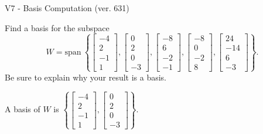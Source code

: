 \begin{exercise}
  \begin{exerciseTitle}V7 - Basis Computation (ver. 631)\end{exerciseTitle}
  \begin{exerciseStatement}
    Find a basis for the subspace 
\[W=\mathrm{span}\ \left\{\left[\begin{array}{r}
-4 \\
2 \\
-1 \\
1
\end{array}\right] , \left[\begin{array}{r}
0 \\
2 \\
0 \\
-3
\end{array}\right] , \left[\begin{array}{r}
-8 \\
6 \\
-2 \\
-1
\end{array}\right] , \left[\begin{array}{r}
-8 \\
0 \\
-2 \\
8
\end{array}\right] , \left[\begin{array}{r}
24 \\
-14 \\
6 \\
-3
\end{array}\right]\right\}.\]
 Be sure to explain why your result is a basis.


  \end{exerciseStatement}
  \begin{exerciseAnswer}
   A basis of \(W\) is  \(\left\{\left[\begin{array}{r}
-4 \\
2 \\
-1 \\
1
\end{array}\right] , \left[\begin{array}{r}
0 \\
2 \\
0 \\
-3
\end{array}\right]\right\}\).
  


  \end{exerciseAnswer}
\end{exercise}